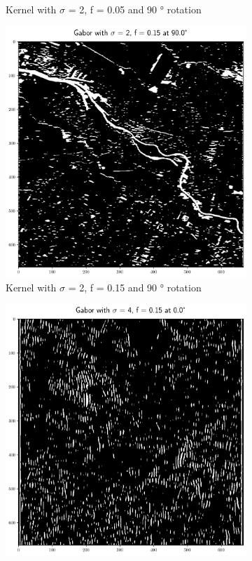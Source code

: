 \documentclass[12pt,a4paper, english]{article}
\begin{document}
\begin{figure}[!htbp]
\begin{subfigure}[b]{0.45\textwidth}
         \caption{Kernel with $\sigma$ = 2, f = 0.05 and 90 ° rotation}\label{fig:feat04}
     \end{subfigure}

     \begin{subfigure}[b]{0.45\textwidth}
         \centering
         \includegraphics[width=\textwidth]{img/Features_2_015_90.png}
         \caption{Kernel with $\sigma$ = 2, f = 0.15 and 90 ° rotation}\label{fig:feat05}
     \end{subfigure}
     \hfill
     \begin{subfigure}[b]{0.45\textwidth}
         \centering
         \includegraphics[width=\textwidth]{img/Features_4_015_0.png}

\end{subfigure}
\end{figure}
\end{document}

